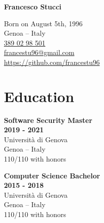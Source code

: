 \documentclass[a4paper,10pt]{article}
\newcommand{\MySkip}{
\vskip12pt
}
\newcommand{\myhref}[2]{%
\href{#1}{\textcolor{ColorTwo}{#2}}
}
\begin{document}
\thispagestyle{empty}

\begin{adjustbox}{valign=t}
\begin{minipage}{0.3\textwidth} %
\begin{center}

\MySkip 	%

{\LARGE \bfseries Francesco Stucci}

\MySkip 	%

Born on August 5th, 1996\\
Genoa -- Italy\\

\MySkip 	%
\textcolor{ColorTwo}{\faPhone} 
\myhref{tel:3890298501}{389 02 98 501} \\

\textcolor{ColorTwo}{\faEnvelopeO} 
\myhref{mailto:francestu96@gmail.com}{francestu96@gmail.com} \\

\textcolor{ColorTwo}{\faChain} 
\myhref{https://github.com/francestu96}{https://github.com/francestu96}
\end{center}

\vfill

\section*{Education}
	\begin{description}
	\raggedright
	\item \textcolor{ColorOne}{\textbf{Software Security Master}}\\
	\textbf{2019 - 2021}\\
	Universit\`a di Genova\\
	Genoa -- Italy\\
	110/110 with honors

	\item \textcolor{ColorOne}{\textbf{Computer Science Bachelor}}\\
	\textbf{2015 - 2018}\\
	Universit\`a di Genova\\
	Genoa -- Italy\\
	110/110 with honors


\end{description}
\end{minipage}
\end{adjustbox}
\end{document}
